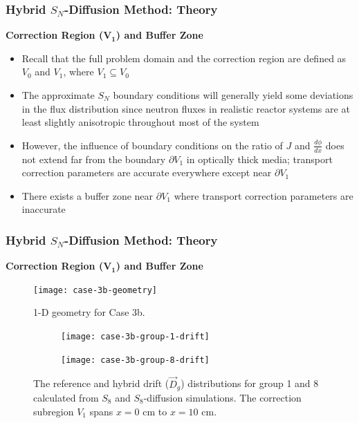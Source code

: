 \begin{frame}
  \frametitle{Hybrid $S_N$-Diffusion Method: Theory}
  \textbf{Correction Region ($\bm{V_1}$) and Buffer Zone}
  \begin{itemize}
    \item Recall that the full problem domain and the correction region are defined as $V_0$
      and $V_1$, where $V_1 \subseteq V_0$
    \item The approximate $S_N$ boundary conditions will generally yield some deviations in the
      flux distribution since neutron fluxes in realistic reactor systems are at least slightly
      anisotropic throughout most of the system
    \item However, the influence of boundary conditions on the ratio of $J$ and $\frac{d\phi}{dx}$
      does not extend far from the boundary $\partial V_1$ in optically thick media; transport
      correction parameters are accurate everywhere except near $\partial V_1$
    \item There exists a buffer zone near $\partial V_1$ where transport correction parameters
      are inaccurate
  \end{itemize}
\end{frame}

\begin{frame}
  \frametitle{Hybrid $S_N$-Diffusion Method: Theory}
  \textbf{Correction Region ($\bm{V_1}$) and Buffer Zone}
  \begin{figure}[htb!]
    \centering
    \texttt{[image: case-3b-geometry]}
    \caption{1-D geometry for Case 3b.}
    \label{fig:3b-geometry}
  \end{figure}
  \begin{figure}[htb!]
      \centering
      \begin{subfigure}[t]{.49\textwidth}
          \centering
          \texttt{[image: case-3b-group-1-drift]}
      \end{subfigure}
      \hfill
      \begin{subfigure}[t]{.49\textwidth}
          \centering
          \texttt{[image: case-3b-group-8-drift]}
      \end{subfigure}
      \caption{The reference and hybrid drift ($\vec{D}_g$) distributions for group 1 and 8 calculated
        from $S_8$ and $S_8$-diffusion simulations. The correction subregion $V_1$ spans $x=0$ cm to
        $x=10$ cm.}
      \label{fig:3b-drift-1}
  \end{figure}
\end{frame}

